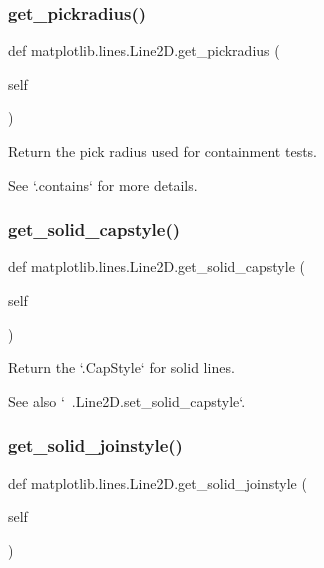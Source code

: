 \subsubsection{\texorpdfstring{get\+\_\+pickradius()}{get\_pickradius()}}
{\footnotesize\ttfamily def matplotlib.\+lines.\+Line2\+D.\+get\+\_\+pickradius (\begin{DoxyParamCaption}\item[{}]{self }\end{DoxyParamCaption})}

\begin{DoxyVerb}Return the pick radius used for containment tests.

See `.contains` for more details.
\end{DoxyVerb}
 \mbox{\label{classmatplotlib_1_1lines_1_1Line2D_a232ab7b1cb1044dce8abfc3e32120460}} 
\subsubsection{\texorpdfstring{get\+\_\+solid\+\_\+capstyle()}{get\_solid\_capstyle()}}
{\footnotesize\ttfamily def matplotlib.\+lines.\+Line2\+D.\+get\+\_\+solid\+\_\+capstyle (\begin{DoxyParamCaption}\item[{}]{self }\end{DoxyParamCaption})}

\begin{DoxyVerb}Return the `.CapStyle` for solid lines.

See also `~.Line2D.set_solid_capstyle`.
\end{DoxyVerb}
 \mbox{\label{classmatplotlib_1_1lines_1_1Line2D_a99a1c9e271c719f23ec9fad8956cb7c2}} 
\subsubsection{\texorpdfstring{get\+\_\+solid\+\_\+joinstyle()}{get\_solid\_joinstyle()}}
{\footnotesize\ttfamily def matplotlib.\+lines.\+Line2\+D.\+get\+\_\+solid\+\_\+joinstyle (\begin{DoxyParamCaption}\item[{}]{self }\end{DoxyParamCaption})}

